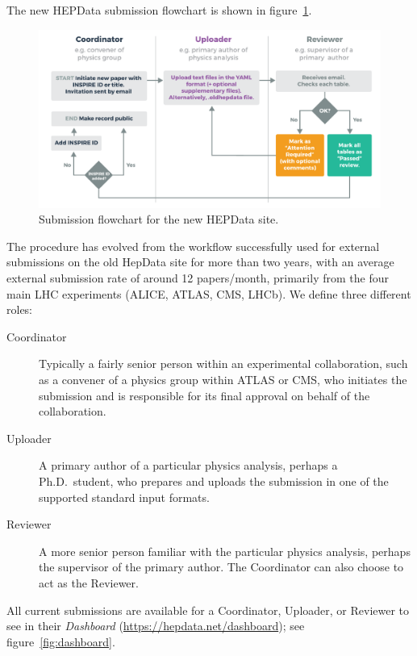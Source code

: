 \documentclass[a4paper]{jpconf}
\begin{document}
The new HEPData submission flowchart is shown in figure~\ref{fig:submission}.
%
\begin{figure}
  \begin{center}
    \includegraphics[width=\textwidth]{Figures/submission_flow_updated.pdf}
  \end{center}
  \caption{\label{fig:submission}Submission flowchart for the new HEPData site.}
\end{figure}
%
The procedure has evolved from the workflow successfully used for external
submissions on the old HepData site for more than two years, with an average
external submission rate of around 12 papers/month, primarily from the four
main LHC experiments (ALICE, ATLAS, CMS, LHCb).  We define three different
roles:
%
\begin{description}
\item [Coordinator] Typically a fairly senior person within an experimental
collaboration, such as a convener of a physics group within ATLAS or CMS, who
initiates the submission and is responsible for its final approval on behalf of
the collaboration.
\item [Uploader] A primary author of a particular physics analysis, perhaps a
Ph.D.~student, who prepares and uploads the submission in one of the supported
standard input formats.
\item [Reviewer] A more senior person familiar with the particular physics
analysis, perhaps the supervisor of the primary author.  The Coordinator can
also choose to act as the Reviewer.
\end{description}
%
All current submissions are available for a Coordinator, Uploader, or Reviewer
to see in their \emph{Dashboard} (\url{https://hepdata.net/dashboard}); see
figure~\ref{fig:dashboard}.
%
\end{document}
